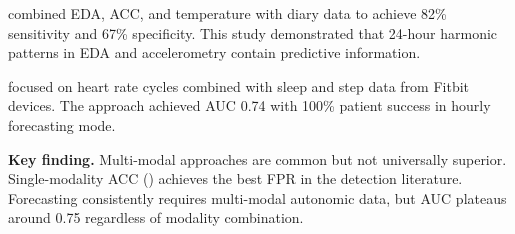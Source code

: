 \textcite{vielufSeizureMonitoringCombined2025} combined EDA, ACC, and temperature with diary data to achieve 82\% sensitivity and 67\% specificity. This study demonstrated that 24-hour harmonic patterns in EDA and accelerometry contain predictive information.

\textcite{stirlingForecastingSeizureLikelihood2021} focused on heart rate cycles combined with sleep and step data from Fitbit devices. The approach achieved AUC 0.74 with 100\% patient success in hourly forecasting mode.

\textbf{Key finding.} Multi-modal approaches are common but not universally superior. Single-modality ACC (\textcite{spahrDeepLearningbasedDetection2025}) achieves the best FPR in the detection literature. Forecasting consistently requires multi-modal autonomic data, but AUC plateaus around 0.75 regardless of modality combination.

